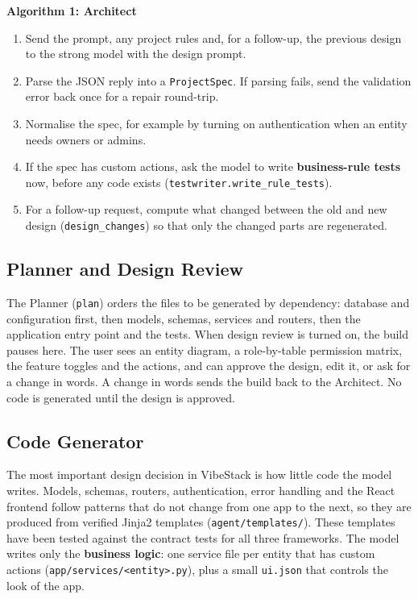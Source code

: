 \documentclass[12pt,a4paper]{report}
\begin{document}
\noindent\textbf{Algorithm 1: Architect}
\begin{enumerate}
    \item Send the prompt, any project rules and, for a follow-up, the previous design to the strong model with the design prompt.
    \item Parse the JSON reply into a \texttt{ProjectSpec}. If parsing fails, send the validation error back once for a repair round-trip.
    \item Normalise the spec, for example by turning on authentication when an entity needs owners or admins.
    \item If the spec has custom actions, ask the model to write \textbf{business-rule tests} now, before any code exists (\texttt{testwriter.write\_rule\_tests}).
    \item For a follow-up request, compute what changed between the old and new design (\texttt{design\_changes}) so that only the changed parts are regenerated.
\end{enumerate}

\subsection{Planner and Design Review}

The Planner (\texttt{plan}) orders the files to be generated by dependency: database and configuration first, then models, schemas, services and routers, then the application entry point and the tests. When design review is turned on, the build pauses here. The user sees an entity diagram, a role-by-table permission matrix, the feature toggles and the actions, and can approve the design, edit it, or ask for a change in words. A change in words sends the build back to the Architect. No code is generated until the design is approved.

\subsection{Code Generator}

The most important design decision in VibeStack is how little code the model writes. Models, schemas, routers, authentication, error handling and the React frontend follow patterns that do not change from one app to the next, so they are produced from verified Jinja2 templates (\texttt{agent/templates/}). These templates have been tested against the contract tests for all three frameworks. The model writes only the \textbf{business logic}: one service file per entity that has custom actions (\texttt{app/services/<entity>.py}), plus a small \texttt{ui.json} that controls the look of the app.
\end{document}
